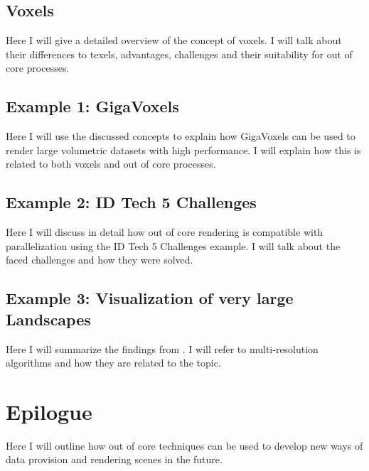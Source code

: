 \section{Voxels}

Here I will give a detailed overview of the concept of voxels. I will talk about their differences to texels, advantages, challenges and their suitability for out of core processes.

\section{Example 1: GigaVoxels}
Here I will use the discussed concepts to explain how GigaVoxels can be used to render large volumetric datasets with high performance. I will explain how this is related to both voxels and out of core processes.

\section{Example 2: ID Tech 5 Challenges}
Here I will discuss in detail how out of core rendering is compatible with parallelization using the ID Tech 5 Challenges example. I will talk about the faced challenges and how they were solved. 

\section{Example 3: Visualization of very large Landscapes}
Here I will summarize the findings from \cite{10.1007/978-3-540-40014-1_3}. I will refer to multi-resolution algorithms and how they are related to the topic.

\chapter{Epilogue}
\label{ch:Epilogue}

Here I will outline how out of core techniques can be used to develop new ways of data provision and rendering scenes in the future. 